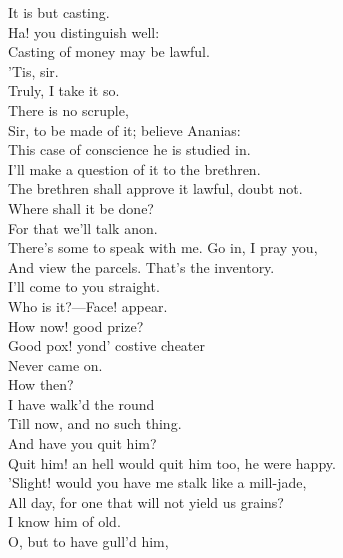 \documentclass[a4paper,oneside]{memoir}
\begin{document}
\begin{drama*}
It is but casting.\\
\tribulationspeaks {} Ha! you distinguish well:\\
Casting of money may be lawful.\\
\ananiasspeaks {} 'Tis, sir.\\
\tribulationspeaks Truly, I take it so.\\
\subtlespeaks {} There is no scruple,\\
Sir, to be made of it; believe Ananias:\\
This case of conscience he is studied in.\\
\tribulationspeaks I'll make a question of it to the brethren.\\
\ananiasspeaks The brethren shall approve it lawful, doubt not.\\
Where shall it be done?\\
\subtlespeaks {} For that we'll talk anon.\\
There's some to speak with me. Go in, I pray you,\\
And view the parcels. That's the inventory.\\
I'll come to you straight.\\
Who is it?---Face! appear.\\
How now! good prize?\\
\facespeaks {} Good pox! yond' costive cheater\\
Never came on.\\
\subtlespeaks {} How then?\\
\facespeaks {} I have walk'd the round\\
Till now, and no such thing.\\
\subtlespeaks {} And have you quit him?\\
\facespeaks Quit him! an hell would quit him too, he were happy.\\
'Slight! would you have me stalk like a mill-jade,\\
All day, for one that will not yield us grains?\\
I know him of old.\\
\subtlespeaks {} O, but to have gull'd him,\\

\end{drama*}
\end{document}
